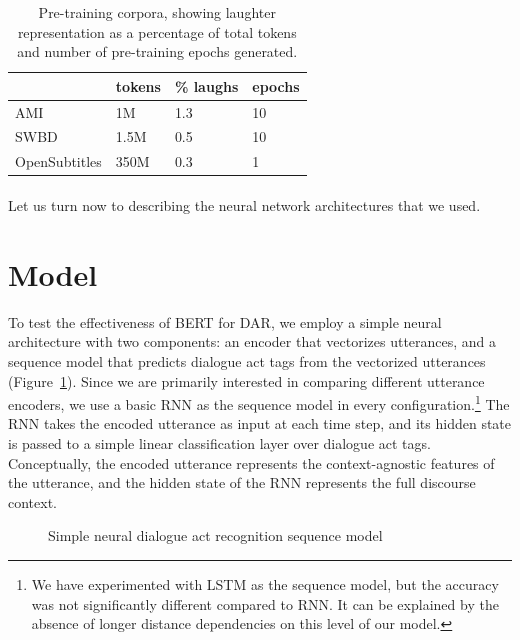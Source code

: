 \documentclass[11pt,a4paper]{article}
\begin{document}
\begin{table}[ht]
\centering
\begin{tabular}{@{}llll@{}}
\toprule
       & tokens & \% laughs & epochs\\ \midrule
AMI           & 1M     & 1.3             & 10     \\
SWBD          & 1.5M   & 0.5             & 10     \\
OpenSubtitles & 350M   & 0.3             & 1      \\ \bottomrule
\end{tabular}
\caption{Pre-training corpora, showing laughter representation as a percentage of total tokens and number of pre-training epochs generated.}\label{tab:pretraining-corpora}
\end{table}

\paragraph{}
Let us turn now to describing the neural network architectures that we used.
  
\section{Model} %

To test the effectiveness of BERT for DAR, we employ a simple neural architecture with two components: an encoder that vectorizes utterances, and a sequence model that predicts dialogue act tags from the vectorized utterances (Figure~\ref{fig:model-architecture}).
Since we are primarily interested in comparing different utterance encoders, we use a basic RNN as the sequence model in every configuration.\footnote{We have experimented with LSTM as the sequence model, but the accuracy was not significantly different compared to RNN. It can be explained by the absence of longer distance dependencies on this level of our model.} 
The RNN takes the encoded utterance as input at each time step,
and its hidden state is passed to a simple linear classification layer over dialogue act tags.
Conceptually, the encoded utterance represents the context-agnostic features of the utterance, and the hidden state of the RNN represents the full discourse context.

\begin{figure}
  
  \caption{Simple neural dialogue act recognition sequence model}
  \label{fig:model-architecture}
\end{figure}
\end{document}
